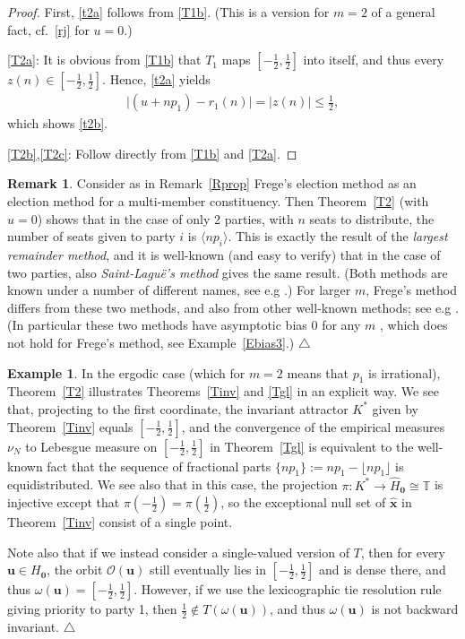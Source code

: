 \documentclass[11pt,reqno,tbtags,a4paper]{amsart}
\numberwithin{equation}{section}
\renewcommand\le{\leq}
\renewcommand\leq{\leqslant}
\theoremstyle{plain}%
\theoremstyle{definition}
\newcommand\xqed[1]{%
    \leavevmode\unskip\penalty9999 \hbox{}\nobreak\hfill
    \quad\hbox{#1}}
\newtheorem{exampleqqq}[theorem]{Example}
\newenvironment{example}{\begin{exampleqqq}}
  {\xqed{$\triangle$}\end{exampleqqq}}
\newtheorem{remarkqqq}[theorem]{Remark}
\newenvironment{remark}{\begin{remarkqqq}}
  {\xqed{$\triangle$}\end{remarkqqq}}
\theoremstyle{remark}
\newcommand\pfitemx[1]{\par#1:}
\newcommand\pfitemref[1]{\pfitemx{\ref{#1}}}
\newcommand{\refT}[1]{Theorem~\ref{#1}}
\newcommand{\refTs}[1]{Theorems~\ref{#1}}
\newcommand{\refR}[1]{Remark~\ref{#1}}
\newcommand{\refE}[1]{Example~\ref{#1}}
\newcommand\bigabs[1]{\bigl\lvert#1\bigr\rvert}
\newcommand\floor[1]{\lfloor#1\rfloor}
\newcommand\round[1]{\langle#1\rangle}
\newcommand\frax[1]{\{#1\}}
\newcommand\punkt{\xperiod}    %
\newcommand\eg{e.g\punkt}
\newcommand\bbT{\mathbb T}
\newcommand\cL{{\omega}}
\newcommand\cO{\mathcal O}
\newcommand\SL{Saint-Lagu\"e}
\newcommand\Ho{H_{\0}}
\newcommand\hHo{\hH_{\0}}
\newcommand\vu{\mathbf{u}}
\newcommand\hvx{\hat{\mathbf{x}}}
\newcommand\hH{\widehat{H}}
\newcommand\Kx{K^*}
\newcommand\0{{\boldsymbol 0}}
\newcommand\1{{\boldsymbol 1}}
\begin{document}
\begin{proof}
First, \eqref{t2a} follows from \eqref{T1b}. 
(This is a version for $m=2$ of a general fact, cf.\ \eqref{rj} for $u=0$.)

\pfitemref{T2a}
  It is obvious from \eqref{T1b} that $T_1$ maps $[-\frac12,\frac12]$ into
  itself, and thus every $z(n)\in[-\frac12,\frac12]$.
Hence, \eqref{t2a} yields
\begin{align}
  \bigabs{(u+np_1)-r_1(n)} = \bigabs{z(n)} \le \tfrac12,
\end{align}
  which shows \eqref{t2b}.

\pfitemx{\ref{T2b},\ref{T2c}}
Follow directly from \eqref{T1b} and \ref{T2a}.
\end{proof}


\begin{remark}\label{RFrege2}
  Consider as in \refR{Rprop} Frege's election method as an election method
  for a multi-member constituency. Then \refT{T2} (with $u=0$) shows that
in the case of only 2 parties, with $n$ seats to distribute,   
the number of seats given to party $i$ is $\round{np_i}$.
This is exactly the result of the \emph{largest remainder method},
and it is well-known (and easy to verify) that in the case of two parties,
also \emph{\SL's method} gives the same result.
(Both methods are known under a number of different names, see \eg{}
\cite[pp.~76 and 70]{Pukelsheim}.)
For larger $m$, Frege's method differs from these two methods, and also from
other well-known methods; 
see \eg{} %
\cite[Example 7]{HLL}.
(In particular these two methods have asymptotic bias
$0$ for any $m$ \cite{SJ262}, 
which does not hold for Frege's method, see \refE{Ebias3}.)
\end{remark}

\begin{example}\label{Em=2I}
In the ergodic case (which for $m=2$ means that $p_1$ is irrational),
\refT{T2} illustrates \refTs{Tinv} and \ref{Tgl} in an explicit way.
We see that, projecting to the first coordinate, 
the invariant attractor $\Kx$ given by \refT{Tinv} equals
$[-\frac12,\frac12]$, and the convergence of the empirical measures
$\nu_N$ to Lebesgue measure on $[-\frac12,\frac12]$ in \refT{Tgl}
is equivalent to the well-known fact that the sequence of
fractional parts $\frax{np_1}:=np_1-\floor{np_1}$ is equidistributed.
We see also that in this case, the projection $\pi:\Kx\to\hHo\cong\bbT$
is injective except that $\pi(-\frac12)=\pi(\frac12)$, so the exceptional
null set of $\hvx$ in \refT{Tinv} consist of a single point.  

Note also that if we instead consider a single-valued version of $T$,
then 
for every $\vu\in\Ho$, 
the orbit $\cO(\vu)$ still eventually lies in $[-\frac12,\frac12]$ 
and is dense there,
and thus $\cL(\vu)=[-\frac12,\frac12]$.
However, if we use the lexicographic tie resolution rule giving priority to
party 1, then
$\frac12\notin T(\cL(\vu))$, and thus $\cL(\vu)$ is not backward invariant.
\end{example}
\end{document}
